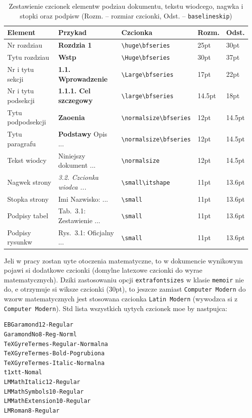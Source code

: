 \begin{table}[htb]
\centering
\caption{Zestawienie czcionek elementw podziau dokumentu, tekstu wiodcego, nagwka i stopki oraz podpisw (Rozm. -- rozmiar czcionki, Odst. -- \texttt{baselineskip})}
\label{tab:secfonts}\small
\begin{tabularx}{\linewidth}{|ll@{\hskip 5pt}l@{\hskip 5pt}lX|} \hline
Element & Przykad & Czcionka & Rozm. & Odst. \\ \hline\hline
Nr rozdziau & {\huge\bfseries Rozdzia 1 } & \verb?\huge\bfseries? & 25pt & 30pt \\
Tytu rozdziau & {\Huge\bfseries Wstp } & \verb?\Huge\bfseries? & 30pt & 37pt\\
Nr i tytu sekcji & {\Large\bfseries 1.1. Wprowadzenie } & \verb?\Large\bfseries? & 17pt & 22pt \\
Nr i tytu podsekcji & {\large\bfseries 1.1.1. Cel szczegowy } & \verb?\large\bfseries? &14.5pt & 18pt\\
Tytu podpodsekcji  & {\normalsize\bfseries Zaoenia } & \verb?\normalsize\bfseries? & 12pt & 14.5pt\\
Tytu paragrafu & {\normalsize\bfseries  Podstawy } Opis ... &  \verb?\normalsize\bfseries? & 12pt & 14.5pt\\
Tekst wiodcy & {\normalsize Niniejszy dokument ... } & \verb?\normalsize? & 12pt & 14.5pt\\
Nagwek strony & {\small\itshape 3.2. Czcionka wiodca ...} & \verb?\small\itshape? & 11pt & 13.6pt \\
Stopka strony & {\small Imi Nazwisko: ...} & \verb?\small? & 11pt & 13.6pt\\
Podpisy tabel & {\small Tab.~3.1: Zestawienie ...} & \verb?\small? & 11pt & 13.6pt \\
Podpisy rysunkw & {\small Rys.~3.1: Oficjalny ...} & \verb?\small? & 11pt & 13.6pt\\\hline
\end{tabularx}
\end{table}

Jeli w pracy zostan uyte otoczenia matematyczne, to w dokumencie wynikowym pojawi si dodatkowe czcionki (domylne latexowe czcionki do wyrae matematycznych). Dziki zastosowaniu opcji \texttt{extrafontsizes} w klasie \texttt{memoir} nie do, e otrzymuje si wiksze czcionki (30pt), to jeszcze zamiast \texttt{Computer Modern} do wzorw matematycznych jest stosowana czcionka \texttt{Latin Modern} (wywodzca si z \texttt{Computer Modern}).
Std lista wszystkich uytych czcionek moe by nastpujca:
\begin{lstlisting}[basicstyle=\footnotesize\ttfamily]
EBGaramond12-Regular
GaramondNo8-Reg-Norml
TeXGyreTermes-Regular-Normalna
TeXGyreTermes-Bold-Pogrubiona
TeXGyreTermes-Italic-Normalna
t1xtt-Nomal
LMMathItalic12-Regular
LMMathSymbols10-Regular
LMMathExtension10-Regular
LMRoman8-Regular
\end{lstlisting}

